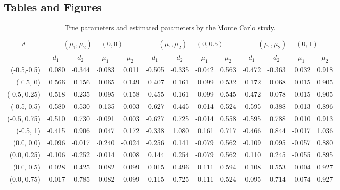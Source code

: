 \documentclass[11pt,fleqn]{article}
\begin{document}
{\begin{landscape}
\begin{table}[!ht]
		\section*{Tables and Figures}
		\centering
		\caption{True parameters and estimated parameters by the Monte Carlo study.}
		\begin{tabular}{|r|rrrr|rrrr|rrrr|}
			\hline
			\multicolumn{1}{|c|}{\multirow{2}[4]{*}{$ d $}} & \multicolumn{4}{c|}{$ (\mu_1,\mu_2)=(0,0)$}    & \multicolumn{4}{c|}{$ (\mu_1,\mu_2)=(0,0.5)$}  & \multicolumn{4}{c|}{$ (\mu_1,\mu_2)=(0,1)$} \\
			\cline{2-13}    \multicolumn{1}{|c|}{} & \multicolumn{1}{c}{$ d_1 $} & \multicolumn{1}{c}{$ d_2$} & \multicolumn{1}{c}{$\mu_1$} & \multicolumn{1}{c|}{$ \mu_2 $} & \multicolumn{1}{c}{$d_1$} & \multicolumn{1}{c}{$d_2$} & \multicolumn{1}{c}{$\mu_1$} & \multicolumn{1}{c|}{$\mu_2$} & \multicolumn{1}{c}{$ d_1 $} & \multicolumn{1}{c}{$d_2$} & \multicolumn{1}{c}{$\mu_1$} & \multicolumn{1}{c|}{$\mu_2$} \\
			\hline
			(-0.5,-0.5) & 0.080 & -0.344 & -0.083 & 0.011 & -0.505 & -0.335 & -0.042 & 0.563 & -0.472 & -0.363 & 0.032 & 0.918 \\
			(-0.5, 0) & -0.566 & -0.156 & -0.065 & 0.149 & -0.407 & -0.161 & 0.099 & 0.532 & -0.172 & 0.068 & 0.015 & 0.905 \\
			(-0.5, 0.25) & -0.518 & -0.235 & -0.095 & 0.158 & -0.455 & -0.161 & 0.099 & 0.545 & -0.472 & 0.078 & 0.015 & 0.905 \\
			(-0.5, 0.5) & -0.580 & 0.530 & -0.135 & 0.003 & -0.627 & 0.445 & -0.014 & 0.524 & -0.595 & 0.388 & 0.013 & 0.896 \\
			(-0.5, 0.75) & -0.510 & 0.730 & -0.091 & 0.003 & -0.627 & 0.725 & -0.014 & 0.558 & -0.595 & 0.788 & 0.010 & 0.913 \\
			(-0.5, 1) & -0.415 & 0.906 & 0.047 & 0.172 & -0.338 & 1.080 & 0.161 & 0.717 & -0.466 & 0.844 & -0.017 & 1.036\\
			\hline
			(0.0, 0.0) & -0.096 & -0.017 & -0.240 & -0.024 & -0.256 & 0.141 & -0.079 & 0.562 & -0.109 & 0.095 & -0.057 & 0.880 \\
			(0.0, 0.25) & -0.106 & -0.252 & -0.014 & 0.008 & 0.144 & 0.254 & -0.079 & 0.562 & 0.110 & 0.245 & -0.055 & 0.895 \\
			(0.0, 0.5) & 0.028 & 0.425 & -0.082 & -0.099 & 0.015 & 0.496 & -0.111 & 0.594 & 0.108 & 0.553 & -0.004 & 0.927 \\
			(0.0, 0.75) & 0.017 & 0.785 & -0.082 & -0.099 & 0.115 & 0.725 & -0.111 & 0.524 & 0.095 & 0.714 & -0.074 & 0.927 \\

\end{tabular}
\end{table}
\end{landscape}}
\end{document}
